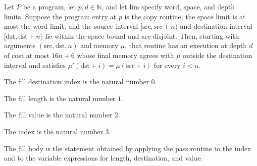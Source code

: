\begin{theorem}
\label{Light.copy_meets}
\leanok
{}
Let $P$ be a program, let $p,d\in\mathbb{N}$, and let $\mathrm{lim}$ specify word,
space, and depth limits. Suppose the program entry at $p$ is the copy routine, the space
limit is at most the word limit, and the source interval $[\mathrm{src},\mathrm{src}+n)$
and destination interval $[\mathrm{dst},\mathrm{dst}+n)$ lie within the space bound and
are disjoint. Then, starting with arguments $(\mathrm{src},\mathrm{dst},n)$ and memory
$\mu$, that routine has an execution at depth $d$ of cost at most $16n+6$ whose final
memory agrees with $\mu$ outside the destination interval and satisfies
$\mu'(\mathrm{dst}+i)=\mu(\mathrm{src}+i)$ for every $i<n$.
\end{theorem}

\begin{definition}
\label{Light.Fill.Dst}
\leanok
The fill destination index is the natural number $0$.
\end{definition}

\begin{definition}
\label{Light.Fill.Len}
\leanok
{}
The fill length is the natural number $1$.
\end{definition}

\begin{definition}
\label{Light.Fill.Val}
\leanok
{}
The fill value is the natural number $2$.
\end{definition}

\begin{definition}
\label{Light.Fill.Idx}
\leanok
{}
The index is the natural number $3$.
\end{definition}

\begin{definition}
\label{Light.fillBody}
\leanok
{}
The fill body is the statement obtained by applying the pass routine to the index and to
the variable expressions for length, destination, and value.
\end{definition}

